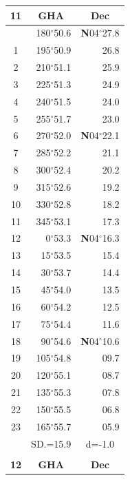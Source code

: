 \documentclass[10pt, a4paper]{report}
\begin{document}
\begin{scriptsize}
\begin{tabular*}{0.2\textwidth}[t]{@{\extracolsep{\fill}}|c|rr|}
\hline
\multicolumn{1}{|c|}{\rule{0pt}{2.6ex}\textbf{11}} & \multicolumn{1}{c}{\textbf{GHA}} & \multicolumn{1}{c|}{\textbf{Dec}}\\
\hline\rule{0pt}{2.6ex}\noindent
0 & 180$^\circ$50.6 & \textbf{N}04$^\circ$27.8\\
1 & 195$^\circ$50.9 & 26.8\\
2 & 210$^\circ$51.1 & 25.9\\
3 & 225$^\circ$51.3 & \raisebox{0.24ex}{\boldmath$\cdot$~\boldmath$\cdot$~~}24.9\\
4 & 240$^\circ$51.5 & 24.0\\
5 & 255$^\circ$51.7 & 23.0\\[2Pt]
6 & 270$^\circ$52.0 & \textbf{N}04$^\circ$22.1\\
7 & 285$^\circ$52.2 & 21.1\\
8 & 300$^\circ$52.4 & 20.2\\
9 & 315$^\circ$52.6 & \raisebox{0.24ex}{\boldmath$\cdot$~\boldmath$\cdot$~~}19.2\\
10 & 330$^\circ$52.8 & 18.2\\
11 & 345$^\circ$53.1 & 17.3\\[2Pt]
12 & 0$^\circ$53.3 & \textbf{N}04$^\circ$16.3\\
13 & 15$^\circ$53.5 & 15.4\\
14 & 30$^\circ$53.7 & 14.4\\
15 & 45$^\circ$54.0 & \raisebox{0.24ex}{\boldmath$\cdot$~\boldmath$\cdot$~~}13.5\\
16 & 60$^\circ$54.2 & 12.5\\
17 & 75$^\circ$54.4 & 11.6\\[2Pt]
18 & 90$^\circ$54.6 & \textbf{N}04$^\circ$10.6\\
19 & 105$^\circ$54.8 & 09.7\\
20 & 120$^\circ$55.1 & 08.7\\
21 & 135$^\circ$55.3 & \raisebox{0.24ex}{\boldmath$\cdot$~\boldmath$\cdot$~~}07.8\\
22 & 150$^\circ$55.5 & 06.8\\
23 & 165$^\circ$55.7 & 05.9\\
\hline
\rule{0pt}{2.4ex} & \multicolumn{1}{c}{SD.=15.9} & \multicolumn{1}{c|}{d=-1.0}\\
\hline
\multicolumn{1}{c}{}\\[-0.5ex]\hline
\multicolumn{1}{|c|}{\rule{0pt}{2.6ex}\textbf{12}} & \multicolumn{1}{c}{\textbf{GHA}} & \multicolumn{1}{c|}{\textbf{Dec}}\\

\end{tabular*}
\end{scriptsize}
\end{document}
